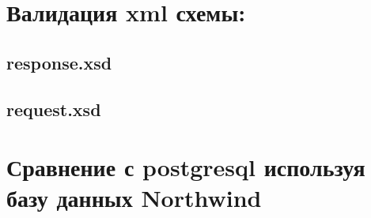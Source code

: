 \documentclass[12pt,onecolumn]{article}
\begin{document}
\section{Валидация xml схемы:}
\subsection{response.xsd}


\subsection{request.xsd}


\section{Сравнение с postgresql используя базу данных Northwind}
\end{document}
